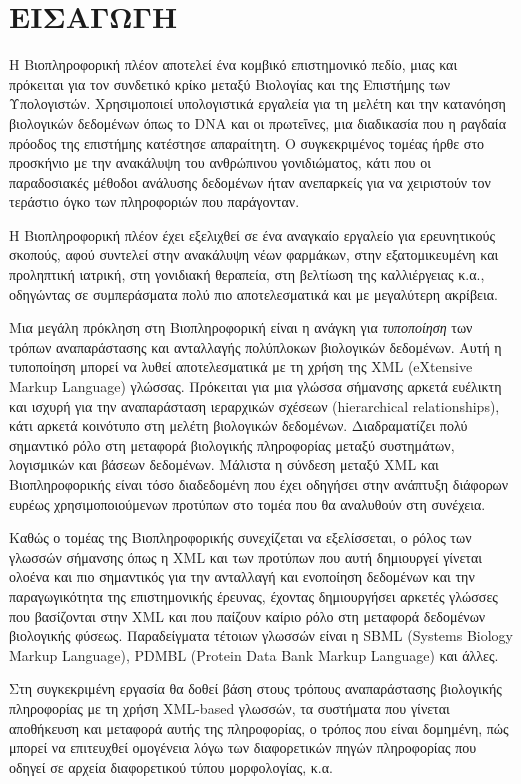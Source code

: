 \chapter{ΕΙΣΑΓΩΓΗ}

    Η Βιοπληροφορική πλέον αποτελεί ένα κομβικό επιστημονικό πεδίο, μιας και πρόκειται για τον συνδετικό κρίκο μεταξύ Βιολογίας και της Επιστήμης των Υπολογιστών.
    Χρησιμοποιεί υπολογιστικά εργαλεία για τη μελέτη και την κατανόηση βιολογικών δεδομένων όπως το DNA και οι πρωτεΐνες, μια διαδικασία που η ραγδαία πρόοδος της επιστήμης κατέστησε απαραίτητη.
    Ο συγκεκριμένος τομέας ήρθε στο προσκήνιο με την ανακάλυψη του ανθρώπινου γονιδιώματος, κάτι που οι παραδοσιακές μέθοδοι ανάλυσης δεδομένων ήταν ανεπαρκείς για να χειριστούν τον τεράστιο όγκο των πληροφοριών που παράγονταν.

    Η Βιοπληροφορική πλέον έχει εξελιχθεί σε ένα αναγκαίο εργαλείο για ερευνητικούς σκοπούς, αφού συντελεί στην ανακάλυψη νέων φαρμάκων, στην εξατομικευμένη και προληπτική ιατρική,
        στη γονιδιακή θεραπεία, στη βελτίωση της καλλιέργειας κ.α., οδηγώντας σε συμπεράσματα πολύ πιο αποτελεσματικά και με μεγαλύτερη ακρίβεια.

    Μια μεγάλη πρόκληση στη Βιοπληροφορική είναι η ανάγκη για \textit{τυποποίηση} των τρόπων αναπαράστασης και ανταλλαγής πολύπλοκων βιολογικών δεδομένων.
    Αυτή η τυποποίηση μπορεί να λυθεί αποτελεσματικά με τη χρήση της XML (eXtensive Markup Language) γλώσσας.
    Πρόκειται για μια γλώσσα σήμανσης αρκετά ευέλικτη και ισχυρή για την αναπαράσταση ιεραρχικών σχέσεων (hierarchical relationships), κάτι αρκετά κοινότυπο στη μελέτη βιολογικών δεδομένων.
    Διαδραματίζει πολύ σημαντικό ρόλο στη μεταφορά βιολογικής πληροφορίας μεταξύ συστημάτων, λογισμικών και βάσεων δεδομένων.
    Μάλιστα η σύνδεση μεταξύ XML και Βιοπληροφορικής είναι τόσο διαδεδομένη που έχει οδηγήσει στην ανάπτυξη διάφορων ευρέως χρησιμοποιούμενων προτύπων στο τομέα που θα αναλυθούν στη συνέχεια.

    Καθώς ο τομέας της Βιοπληροφορικής συνεχίζεται να εξελίσσεται, ο ρόλος των γλωσσών σήμανσης όπως η XML και των προτύπων που αυτή δημιουργεί γίνεται ολοένα και πιο σημαντικός για την ανταλλαγή και ενοποίηση δεδομένων και την παραγωγικότητα της επιστημονικής έρευνας,
        έχοντας δημιουργήσει αρκετές γλώσσες που βασίζονται στην XML και που παίζουν καίριο ρόλο στη μεταφορά δεδομένων βιολογικής φύσεως.
    Παραδείγματα τέτοιων γλωσσών είναι η SBML (Systems Biology Markup Language), PDMBL (Protein Data Bank Markup Language) και άλλες.

    Στη συγκεκριμένη εργασία θα δοθεί βάση στους τρόπους αναπαράστασης βιολογικής πληροφορίας με τη χρήση XML-based γλωσσών, τα συστήματα που γίνεται αποθήκευση και μεταφορά αυτής της πληροφορίας, ο τρόπος που είναι δομημένη, πώς μπορεί να επιτευχθεί ομογένεια λόγω των διαφορετικών πηγών πληροφορίας που οδηγεί σε αρχεία διαφορετικού τύπου μορφολογίας, κ.α.